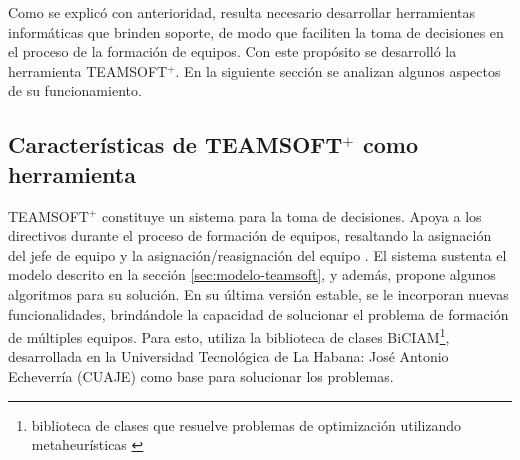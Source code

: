 Como se explicó con anterioridad, resulta necesario desarrollar herramientas informáticas que brinden soporte, de modo que faciliten la toma de decisiones en el proceso de la formación de equipos. Con este propósito se desarrolló la herramienta TEAMSOFT$^+$. En la siguiente sección se analizan algunos aspectos de su funcionamiento.

\subsection{Características de TEAMSOFT$^+$ como herramienta}

TEAMSOFT$^+$ constituye un sistema para la toma de decisiones. Apoya a los directivos durante el proceso de formación de equipos, resaltando la asignación del jefe de equipo y la asignación/reasignación del equipo \citep{Mayi09}. El sistema sustenta el modelo descrito en la sección \ref{sec:modelo-teamsoft}, y además, propone algunos algoritmos para su solución. En su última versión estable, se le incorporan nuevas funcionalidades, brindándole la capacidad de solucionar el problema de formación de múltiples equipos. Para esto, utiliza la biblioteca de clases BiCIAM\footnote{biblioteca de clases que resuelve problemas de optimización utilizando metaheurísticas \cite{GonzalezChaveco2021}}, desarrollada en la Universidad Tecnológica de La Habana: José Antonio Echeverría (CUAJE) como base para solucionar los problemas. \\

